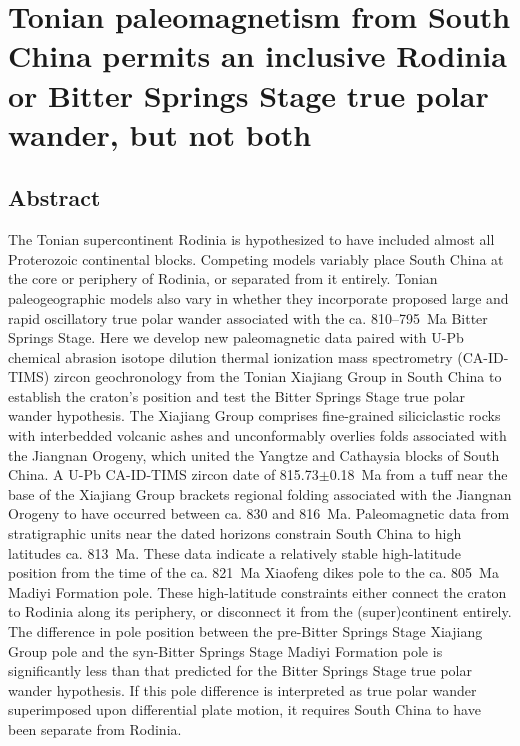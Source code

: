 \chapter[Tonian paleomagnetism from South China permits an inclusive Rodinia or Bitter Springs Stage true polar wander, but not both][Xiajiang Group]{Tonian paleomagnetism from South China permits an inclusive Rodinia or Bitter Springs Stage true polar wander, but not both}

\section{Abstract}

The Tonian supercontinent Rodinia is hypothesized to have included almost all Proterozoic continental blocks. Competing models variably place South China at the core or periphery of Rodinia, or separated from it entirely. Tonian paleogeographic models also vary in whether they incorporate proposed large and rapid oscillatory true polar wander associated with the ca. 810--795~Ma Bitter Springs Stage. Here we develop new paleomagnetic data paired with U-Pb chemical abrasion isotope dilution thermal ionization mass spectrometry (CA-ID-TIMS) zircon geochronology from the Tonian Xiajiang Group in South China to establish the craton's position and test the Bitter Springs Stage true polar wander hypothesis. The Xiajiang Group comprises fine-grained siliciclastic rocks with interbedded volcanic ashes and unconformably overlies folds associated with the Jiangnan Orogeny, which united the Yangtze and Cathaysia blocks of South China. A U-Pb CA-ID-TIMS zircon date of 815.73$\pm$0.18~Ma from a tuff near the base of the Xiajiang Group brackets regional folding associated with the Jiangnan Orogeny to have occurred between ca. 830 and 816~Ma. Paleomagnetic data from stratigraphic units near the dated horizons constrain South China to high latitudes ca. 813~Ma. These data indicate a relatively stable high-latitude position from the time of the ca. 821~Ma Xiaofeng dikes pole to the ca. 805~Ma Madiyi Formation pole. These high-latitude constraints either connect the craton to Rodinia along its periphery, or disconnect it from the (super)continent entirely. The difference in pole position between the pre-Bitter Springs Stage Xiajiang Group pole and the syn-Bitter Springs Stage Madiyi Formation pole is significantly less than that predicted for the Bitter Springs Stage true polar wander hypothesis. If this pole difference is interpreted as true polar wander superimposed upon differential plate motion, it requires South China to have been separate from Rodinia.

